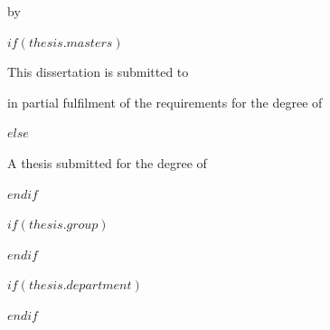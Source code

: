 
\frontmatter
\pagestyle{plain}

\begin{titlepage}
  \thispagestyle{empty}

  \begin{center}

    \vspace*{0.10\textheight}

    {\Large\bfseries \ttitle \par}

    \vspace{1.5cm}

    {\large by \par}

    \vspace{1cm}

    {\Large \authorname \par}

    \vspace{3cm}

    $if(thesis.masters)$
    {\large This dissertation is submitted to \univname \par}
    \vspace{0.2cm}
    {\large in partial fulfilment of the requirements for the degree of \par}
    \vspace{0.5cm}
    {\Large\bfseries \MakeUppercase{\degreename} \par}
    $else$
    {\large A thesis submitted for the degree of \par}
    \vspace{0.2cm}
    {\large \degreename \par}
    $endif$

    \vfill

    $if(thesis.group)$
    {\large \groupname \par}
    \vspace{0.2cm}
    $endif$

    $if(thesis.department)$
    {\large \deptname \par}
    \vspace{0.2cm}
    $endif$


\end{center}
\end{titlepage}
